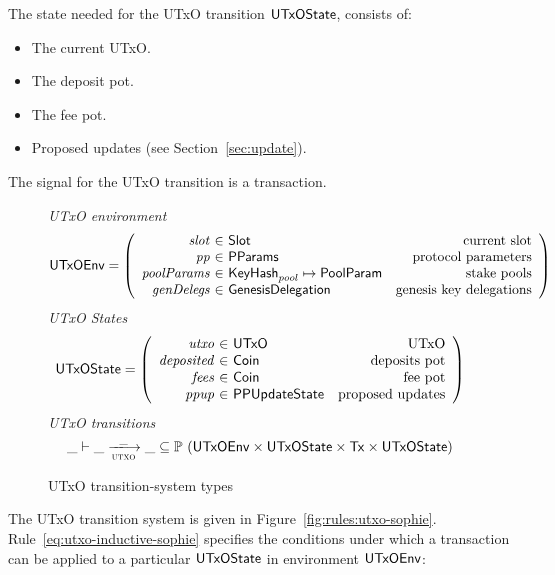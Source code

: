The state needed for the UTxO transition $\mathsf{UTxOState}$, consists of:

\begin{itemize}
  \item The current UTxO.
  \item The deposit pot.
  \item The fee pot.
  \item Proposed updates (see Section~\ref{sec:update}).
\end{itemize}
The signal for the UTxO transition is a transaction.

\begin{figure}[htb]
  \emph{UTxO environment}
  \begin{equation*}
    \UTxOEnv =
    \left(
      \begin{array}{r@{~\in~}lr}
        \var{slot} & \Slot & \text{current slot}\\
        \var{pp} & \PParams & \text{protocol parameters}\\
        \var{poolParams} & \KeyHash_{pool}\mapsto\PoolParam & \text{stake pools}\\
        \var{genDelegs} & \GenesisDelegation & \text{genesis key delegations} \\
      \end{array}
    \right)
  \end{equation*}
  \emph{UTxO States}
  \begin{equation*}
    \UTxOState =
    \left(
      \begin{array}{r@{~\in~}lr}
        \var{utxo} & \UTxO & \text{UTxO}\\
        \var{deposited} & \Coin & \text{deposits pot}\\
        \var{fees} & \Coin & \text{fee pot}\\
        \var{ppup} & \PPUpdateState & \text{proposed updates}\\
      \end{array}
    \right)
  \end{equation*}
  \emph{UTxO transitions}
  \begin{equation*}
    \_ \vdash
    \var{\_} \trans{utxo}{\_} \var{\_}
    \subseteq \powerset (\UTxOEnv \times \UTxOState \times \Tx \times \UTxOState)
  \end{equation*}
  \caption{UTxO transition-system types}
  \label{fig:ts-types:utxo-sophie}
\end{figure}

The UTxO transition system is given in Figure~\ref{fig:rules:utxo-sophie}.
Rule~\ref{eq:utxo-inductive-sophie} specifies the conditions under which a transaction can
be applied to a particular $\mathsf{UTxOState}$ in environment $\mathsf{UTxOEnv}$:

